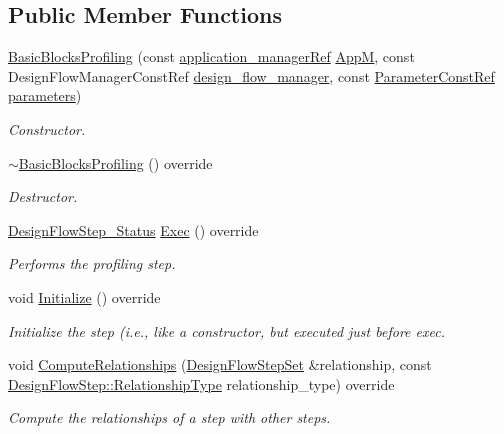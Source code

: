 \subsection*{Public Member Functions}
\begin{DoxyCompactItemize}
\item 
\hyperlink{classBasicBlocksProfiling_ac41d9051359b6628669b6a6dad477d41}{Basic\+Blocks\+Profiling} (const \hyperlink{application__manager_8hpp_a04ccad4e5ee401e8934306672082c180}{application\+\_\+manager\+Ref} \hyperlink{classFrontendFlowStep_a0ac0d8db2a378416583f51c4faa59d15}{AppM}, const Design\+Flow\+Manager\+Const\+Ref \hyperlink{classDesignFlowStep_ab770677ddf087613add30024e16a5554}{design\+\_\+flow\+\_\+manager}, const \hyperlink{Parameter_8hpp_a37841774a6fcb479b597fdf8955eb4ea}{Parameter\+Const\+Ref} \hyperlink{classDesignFlowStep_a802eaafe8013df706370679d1a436949}{parameters})
\begin{DoxyCompactList}\small\item\em Constructor. \end{DoxyCompactList}\item 
\hyperlink{classBasicBlocksProfiling_abb7c76103ba3c784570f8eeba3019659}{$\sim$\+Basic\+Blocks\+Profiling} () override
\begin{DoxyCompactList}\small\item\em Destructor. \end{DoxyCompactList}\item 
\hyperlink{design__flow__step_8hpp_afb1f0d73069c26076b8d31dbc8ebecdf}{Design\+Flow\+Step\+\_\+\+Status} \hyperlink{classBasicBlocksProfiling_a3a818424991cbd10f25d89e2f2d0417d}{Exec} () override
\begin{DoxyCompactList}\small\item\em Performs the profiling step. \end{DoxyCompactList}\item 
void \hyperlink{classBasicBlocksProfiling_a3d2004d81a84529f1048fcc66c6a61d0}{Initialize} () override
\begin{DoxyCompactList}\small\item\em Initialize the step (i.\+e., like a constructor, but executed just before exec. \end{DoxyCompactList}\item 
void \hyperlink{classBasicBlocksProfiling_a7fe35844cefbb68704d111f34b356df0}{Compute\+Relationships} (\hyperlink{classDesignFlowStepSet}{Design\+Flow\+Step\+Set} \&relationship, const \hyperlink{classDesignFlowStep_a723a3baf19ff2ceb77bc13e099d0b1b7}{Design\+Flow\+Step\+::\+Relationship\+Type} relationship\+\_\+type) override
\begin{DoxyCompactList}\small\item\em Compute the relationships of a step with other steps. \end{DoxyCompactList}\end{DoxyCompactItemize}
